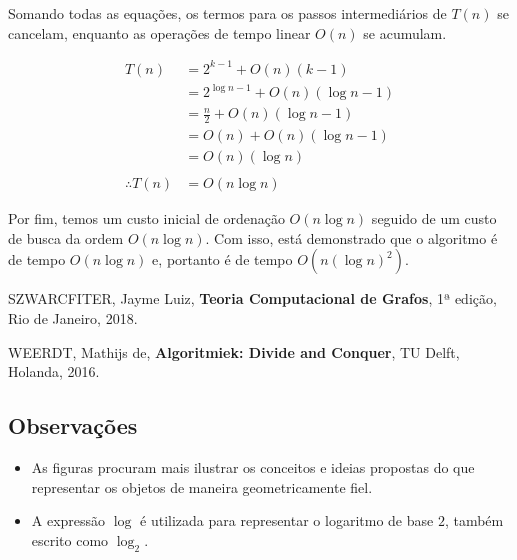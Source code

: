 \documentclass{homework}
\begin{document}
	Somando todas as equações, os termos para os passos intermediários de $T(n)$ se cancelam, enquanto as operações de tempo linear $O(n)$ se acumulam.\par
	
	\pagebreak
	
	\begin{align*}
		T\left(n\right) &= 2^{k-1} + O(n) (k - 1)\\
						&= 2^{\log n - 1} + O(n) (\log n - 1)\\
						&= \frac{n}{2} + O(n) (\log n - 1)\\
						&= O(n) + O(n) (\log n - 1)\\
						&= O(n) (\log n)\\
						~\\
		\therefore T\left(n\right)	&= O(n \log n)
	\end{align*}
	
	Por fim, temos um custo inicial de ordenação $O(n \log n)$ seguido de um custo de busca da ordem $O(n \log n)$. Com isso, está demonstrado que o algoritmo é de tempo $O(n \log n)$ e, portanto é de tempo $O(n (\log n)^2)$.
		
	\begin{thebibliography}{10}
		 SZWARCFITER, Jayme Luiz, \textbf{Teoria Computacional de Grafos}, 1ª edição, Rio de Janeiro, 2018.
		
		 WEERDT, Mathijs de, \textbf{Algoritmiek: Divide and Conquer}, TU Delft, Holanda, 2016.
	\end{thebibliography}

	\subsection*{Observações}
	\begin{itemize}
		\item As figuras procuram mais ilustrar os conceitos e ideias propostas do que representar os objetos de maneira geometricamente fiel.
		\item A expressão $\log$ é utilizada para representar o logaritmo de base $2$, também escrito como $\log_2$.
	\end{itemize}
	
	\newpage
	\let\clearpage\relax
\end{document}
